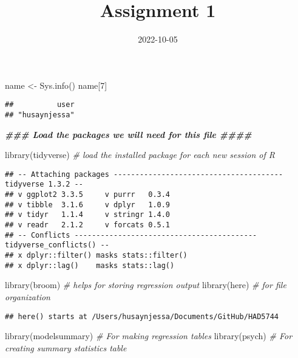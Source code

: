 \documentclass[
]{article}
\title{Assignment 1}
\author{}
\date{\vspace{-2.5em}2022-10-05}
\newenvironment{Shaded}{\begin{snugshade}}{\end{snugshade}}
\newcommand{\CommentTok}[1]{\textcolor[rgb]{0.56,0.35,0.01}{\textit{#1}}}
\newcommand{\DecValTok}[1]{\textcolor[rgb]{0.00,0.00,0.81}{#1}}
\newcommand{\DocumentationTok}[1]{\textcolor[rgb]{0.56,0.35,0.01}{\textbf{\textit{#1}}}}
\newcommand{\FunctionTok}[1]{\textcolor[rgb]{0.00,0.00,0.00}{#1}}
\newcommand{\NormalTok}[1]{#1}
\newcommand{\OtherTok}[1]{\textcolor[rgb]{0.56,0.35,0.01}{#1}}
\begin{document}
\maketitle

\begin{Shaded}
\begin{Highlighting}[]
\NormalTok{name }\OtherTok{\textless{}{-}} \FunctionTok{Sys.info}\NormalTok{()}
\NormalTok{name[}\DecValTok{7}\NormalTok{]}
\end{Highlighting}
\end{Shaded}

\begin{verbatim}
##          user 
## "husaynjessa"
\end{verbatim}

\begin{Shaded}
\begin{Highlighting}[]
\DocumentationTok{\#\#\# Load the packages we will need for this file \#\#\#\#}

\FunctionTok{library}\NormalTok{(tidyverse) }\CommentTok{\# load the installed package for each new session of R}
\end{Highlighting}
\end{Shaded}

\begin{verbatim}
## -- Attaching packages --------------------------------------- tidyverse 1.3.2 --
## v ggplot2 3.3.5     v purrr   0.3.4
## v tibble  3.1.6     v dplyr   1.0.9
## v tidyr   1.1.4     v stringr 1.4.0
## v readr   2.1.2     v forcats 0.5.1
## -- Conflicts ------------------------------------------ tidyverse_conflicts() --
## x dplyr::filter() masks stats::filter()
## x dplyr::lag()    masks stats::lag()
\end{verbatim}

\begin{Shaded}
\begin{Highlighting}[]
\FunctionTok{library}\NormalTok{(broom) }\CommentTok{\# helps for storing regression output}
\FunctionTok{library}\NormalTok{(here) }\CommentTok{\# for file organization}
\end{Highlighting}
\end{Shaded}

\begin{verbatim}
## here() starts at /Users/husaynjessa/Documents/GitHub/HAD5744
\end{verbatim}

\begin{Shaded}
\begin{Highlighting}[]
\FunctionTok{library}\NormalTok{(modelsummary) }\CommentTok{\# For making regression tables}
\FunctionTok{library}\NormalTok{(psych) }\CommentTok{\# For creating summary statistics table}
\end{Highlighting}
\end{Shaded}
\end{document}
